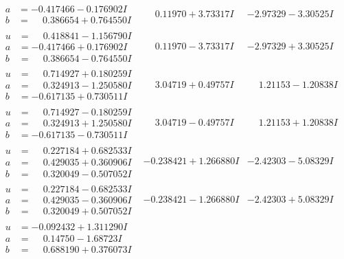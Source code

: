 \documentclass[1p]{elsarticle_modified}
\theoremstyle{definition}
\begin{document}
$$\begin{array}{c|c|c}
\begin{aligned}
a &= -0.417466 - 0.176902 I \\
b &= \phantom{-}0.386654 + 0.764550 I\end{aligned}
 & \phantom{-}0.11970 + 3.73317 I & -2.97329 - 3.30525 I \\ \hline\begin{aligned}
u &= \phantom{-}0.418841 - 1.156790 I \\
a &= -0.417466 + 0.176902 I \\
b &= \phantom{-}0.386654 - 0.764550 I\end{aligned}
 & \phantom{-}0.11970 - 3.73317 I & -2.97329 + 3.30525 I \\ \hline\begin{aligned}
u &= \phantom{-}0.714927 + 0.180259 I \\
a &= \phantom{-}0.324913 - 1.250580 I \\
b &= -0.617135 + 0.730511 I\end{aligned}
 & \phantom{-}3.04719 + 0.49757 I & \phantom{-}1.21153 - 1.20838 I \\ \hline\begin{aligned}
u &= \phantom{-}0.714927 - 0.180259 I \\
a &= \phantom{-}0.324913 + 1.250580 I \\
b &= -0.617135 - 0.730511 I\end{aligned}
 & \phantom{-}3.04719 - 0.49757 I & \phantom{-}1.21153 + 1.20838 I \\ \hline\begin{aligned}
u &= \phantom{-}0.227184 + 0.682533 I \\
a &= \phantom{-}0.429035 + 0.360906 I \\
b &= \phantom{-}0.320049 - 0.507052 I\end{aligned}
 & -0.238421 + 1.266880 I & -2.42303 - 5.08329 I \\ \hline\begin{aligned}
u &= \phantom{-}0.227184 - 0.682533 I \\
a &= \phantom{-}0.429035 - 0.360906 I \\
b &= \phantom{-}0.320049 + 0.507052 I\end{aligned}
 & -0.238421 - 1.266880 I & -2.42303 + 5.08329 I \\ \hline\begin{aligned}
u &= -0.092432 + 1.311290 I \\
a &= \phantom{-}0.14750 - 1.68723 I \\
b &= \phantom{-}0.688190 + 0.376073 I\end{aligned}

\end{array}$$
\end{document}
